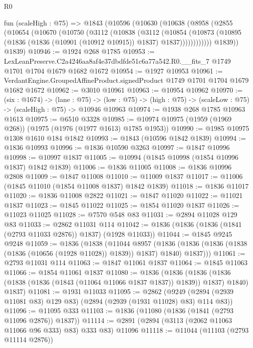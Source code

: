 \begin{lexlean}{R0}
\begin{coremodule}
  fun (scaleHigh : @75) =>
  @1843
    (@10596
      (@10630
        (@10638
          (@8958
            (@2855
              (@10654
                (@10670
                  (@10750
                    (@3112
                      (@10838
                        (@3112
                          (@10854
                            (@10873
                              (@10895
                                (@1836 (@1836 (@10901 (@10912 @10915)) @1837) @1837))))))))))))
          @1839))
      @1839)
@10946 := @1924 @268 @1785
@10953 := LexLeanPreserve.C2a4246aa8af4e37dbdfde51c6a77a542.R0.__fits_7
    @1749
    @1701
    @1704
    @1679
    @1682
    @1672
@10954 := @1927 @10953
@10961 := VerdantEngine.GroupedAffineProduct.signedProduct @1749 @1701 @1704 @1679 @1682 @1672
@10962 := @3010 @10961
@10963 := @10954 @10962
@10970 := (six : @1674) ->
  (lane : @75) ->
  (low : @75) -> (high : @75) -> (scaleLow : @75) -> (scaleHigh : @75) -> @10946 @10963
@10974 := @1938 @268 @1785 @10963 @1613
@10975 := @6510 @3328
@10985 := @10974 @10975 (@1959 (@1969 @268)) (@1975 (@1976 (@1977 @1613) @1785 @1953))
@10990 := @1985 @10975 @1308 @1610 @184 @1842
@10993 := @1843 (@10596 @1842 @1839)
@10994 := @1836 @10993
@10996 := @1836 @10590 @3263
@10997 := @1847 @10996
@10998 := @10997 @1837
@11005 := @10994 (@1845 @10998 (@1854 @10996 @1837) @1842 @1839)
@11006 := @1836 @11005
@11008 := @1836 @10996 @2808
@11009 := @1847 @11008
@11010 := @11009 @1837
@11017 := @11006 (@1845 @11010 (@1854 @11008 @1837) @1842 @1839)
@11018 := @1836 @11017
@11020 := @1836 @11008 @2822
@11021 := @1847 @11020
@11022 := @11021 @1837
@11023 := @1845 @11022
@11025 := @1854 @11020 @1837
@11026 := @11023 @11025
@11028 := @7570 @548 @83
@11031 := @2894 @11028 @129 @83
@11033 := @2862 @11031 @114
@11042 := @1836 (@1836 (@1836 (@1841 (@2793 @11033 @2876)) @1837) (@1928 @11033))
@11044 := @1845 @9245 @9248
@11059 := @1836
    (@1838
      (@11044
        @8957
        (@1836 (@1836 (@1836 (@1838 (@1836 (@10656 (@1928 @11028)) @1839)) @1837) @1840) @1837)))
@11061 := @2793 @11031 @114
@11063 := @1847 @11061 @1837
@11064 := @1845 @11063
@11066 := @1854 @11061 @1837
@11080 := @1836
    (@1836
      (@1836 (@1836 (@1838 (@1836 (@1843 (@11064 @11066 @1837 @1837)) @1839)) @1837) @1840)
      @1837)
@11081 := @1931 @11033
@11095 := @2862
    (@9249 (@2894 (@2939 @11081 @83) @129 @83) (@2894 (@2939 (@1931 @11028) @83) @114 @83))
@11096 := @11095 @333
@11103 := @1836 (@11080 (@1836 (@1841 (@2793 @11096 @2876)) @1837))
@11114 := @2891 (@2894 (@3113 (@2062 @11063 @11066 @96 @333) @83) @333 @83) @11096
@11118 := @11044 (@11103 (@2793 @11114 @2876))

\end{coremodule}
\end{lexlean}
